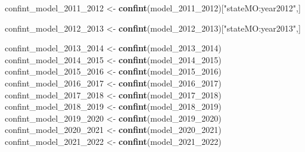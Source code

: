\documentclass[
]{article}
\newenvironment{Shaded}{\begin{snugshade}}{\end{snugshade}}
\newcommand{\FunctionTok}[1]{\textcolor[rgb]{0.13,0.29,0.53}{\textbf{#1}}}
\newcommand{\NormalTok}[1]{#1}
\newcommand{\OtherTok}[1]{\textcolor[rgb]{0.56,0.35,0.01}{#1}}
\newcommand{\StringTok}[1]{\textcolor[rgb]{0.31,0.60,0.02}{#1}}
\begin{document}
\begin{Shaded}
\begin{Highlighting}[]
\NormalTok{confint\_model\_2011\_2012 }\OtherTok{\textless{}{-}} \FunctionTok{confint}\NormalTok{(model\_2011\_2012)[}\StringTok{"stateMO:year2012"}\NormalTok{,]}
          
\NormalTok{confint\_model\_2012\_2013 }\OtherTok{\textless{}{-}} \FunctionTok{confint}\NormalTok{(model\_2012\_2013)[}\StringTok{"stateMO:year2013"}\NormalTok{,]}

\NormalTok{confint\_model\_2013\_2014 }\OtherTok{\textless{}{-}} \FunctionTok{confint}\NormalTok{(model\_2013\_2014)}
\NormalTok{confint\_model\_2014\_2015 }\OtherTok{\textless{}{-}} \FunctionTok{confint}\NormalTok{(model\_2014\_2015)}
\NormalTok{confint\_model\_2015\_2016 }\OtherTok{\textless{}{-}} \FunctionTok{confint}\NormalTok{(model\_2015\_2016)}
\NormalTok{confint\_model\_2016\_2017 }\OtherTok{\textless{}{-}} \FunctionTok{confint}\NormalTok{(model\_2016\_2017)}
\NormalTok{confint\_model\_2017\_2018 }\OtherTok{\textless{}{-}} \FunctionTok{confint}\NormalTok{(model\_2017\_2018)}
\NormalTok{confint\_model\_2018\_2019 }\OtherTok{\textless{}{-}} \FunctionTok{confint}\NormalTok{(model\_2018\_2019)}
\NormalTok{confint\_model\_2019\_2020 }\OtherTok{\textless{}{-}} \FunctionTok{confint}\NormalTok{(model\_2019\_2020)}
\NormalTok{confint\_model\_2020\_2021 }\OtherTok{\textless{}{-}} \FunctionTok{confint}\NormalTok{(model\_2020\_2021)}
\NormalTok{confint\_model\_2021\_2022 }\OtherTok{\textless{}{-}} \FunctionTok{confint}\NormalTok{(model\_2021\_2022)}
\end{Highlighting}
\end{Shaded}
\end{document}
